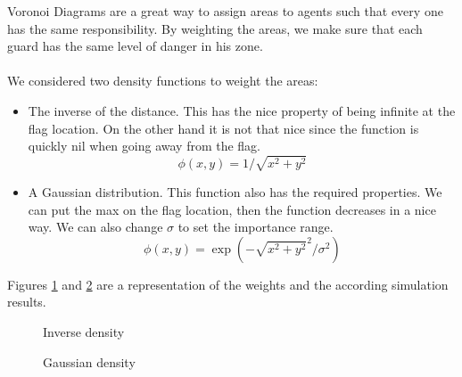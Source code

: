 \documentclass[journal]{IEEEtran}
\begin{document}
Voronoi Diagrams are a great way to assign areas to agents such that every one has the same responsibility. By weighting the areas, we make sure that each guard has the same level of danger in his zone.
\  \\\\
We considered two density functions to weight the areas: 
\begin{itemize}
	\item The inverse of the distance. This has the nice property of being infinite at the flag location. On the other hand it is not that nice since the function is quickly nil when going away from the flag.
	\begin{equation}
	\phi(x,y) = 1/\sqrt{x^2 + y^2} \label{eq2}
	\end{equation}
	\item A Gaussian distribution. This function also has the required properties. We can put the max on the flag location, then the function decreases in a nice way. We can also change $\sigma$ to set the importance range.
	\begin{equation}
	\phi(x,y) = \exp(-\sqrt{x^2 + y^2}^2/\sigma^2) \label{eq3}
	\end{equation}
\end{itemize} 

Figures \ref{weight_inv} and \ref{weight_gauss} are a representation of the weights and the according simulation results.

\begin{figure}
	\centering
	\quad
	\caption{Inverse density}
	\label{weight_inv}
\end{figure}

\begin{figure}
	\centering
	\quad
	\caption{Gaussian density}
	\label{weight_gauss}
\end{figure}
\end{document}
